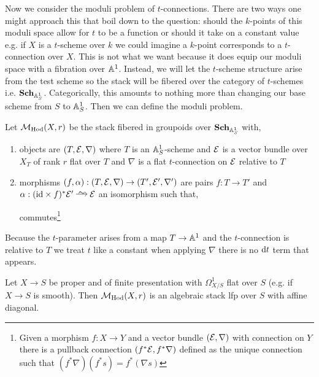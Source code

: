 \documentclass[12pt]{article}
\begin{document}
Now we consider the moduli problem of $t$-connections. There are two ways one might approach this that boil down to the question: should the $k$-points of this moduli space allow for $t$ to be a function or should it take on a constant value e.g. if $X$ is a $t$-scheme over $k$ we could imagine a $k$-point corresponds to a $t$-connection over $X$. This is not what we want because it does equip our moduli space with a fibration over $\mathbb{A}^1$. Instead, we will let the $t$-scheme structure arise from the test scheme so the stack will be fibered over the category of $t$-schemes i.e. $\mathbf{Sch}_{\mathbb{A}^1_S}$. Categorically, this amounts to nothing more than changing our base scheme from $S$ to $\mathbb{A}^1_S$. Then we can define the moduli problem.


\begin{defn}
Let $\mathcal{M}_{\mathrm{Hod}}(X, r)$ be the stack fibered in groupoids over $\mathbf{Sch}_{\mathbb{A}^1_S}$ with,
\begin{enumerate}
\item objects are $(T, \mathcal{E}, \nabla)$ where $T$ is an $\mathbb{A}^1_{S}$-scheme and $\mathcal{E}$ is a vector bundle over $X_T$ of rank $r$ flat over $T$ and $\nabla$ is a flat $t$-connection on $\mathcal{E}$ relative to $T$
\item morphisms $(f, \alpha) : (T, \mathcal{E}, \nabla) \to (T', \mathcal{E}', \nabla')$ are pairs $f : T \to T'$ and $\alpha : (\id \times f)^* \E' \iso \E$ an isomorphism such that,
\begin{center}
\end{center}
commutes\footnote{Given a morphism $f : X \to Y$ and a vector bundle $(\mathcal{E}, \nabla)$ with connection on $Y$ there is a pullback connection $(f^* \mathcal{E}, f^* \nabla)$ defined as the unique connection such that $(f^* \nabla) (f^* s) = f^* (\nabla s)$ }
\end{enumerate}
\end{defn}

\begin{rmk}
Because the $t$-parameter arises from a map $T \to \mathbb{A}^1$ and the $t$-connection is relative to $T$ we treat $t$ like a constant when applying $\nabla$ there is no $\mathrm{d}{t}$ term that appears.
\end{rmk}

\begin{prop}
Let $X \to S$ be proper and of finite presentation with $\Omega^1_{X/S}$ flat over $S$ (e.g. if $X \to S$ is smooth). Then $\mathcal{M}_{\mathrm{Hod}}(X, r)$ is an algebraic stack lfp over $S$ with affine diagonal.
\end{prop}
\end{document}
